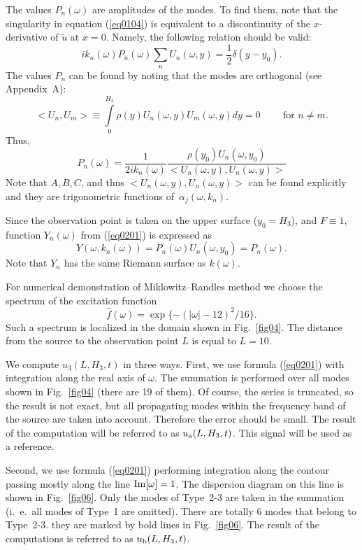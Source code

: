 \documentclass[12pt]{article}
\begin{document}
The values $P_n(\omega)$ are amplitudes of the modes. To find them, note that 
the singularity in equation (\ref{eq0104}) is equivalent to a discontinuity of the $x$-derivative 
of $\tilde u$ at $x =0$. Namely, the following relation should be valid: 
\begin{equation}
i k_n (\omega) P_n(\omega) \sum_n U_n(\omega , y) = \frac{1}{2} \delta(y-y_0) .
\label{eq0404}
\end{equation}  
The values $P_n$ can be found by noting that the modes are orthogonal (see Appendix~A): 
\begin{equation}
<U_n , U_m> \equiv
\int \limits_0^{H_3} \rho(y) U_n (\omega,y) U_m(\omega,y) dy = 
0
\qquad
\mbox{ for }
n \ne m.
\label{eq0405}
\end{equation}
Thus, 
\begin{equation}
P_n(\omega) = \frac{1}{2 i k_n (\omega)} 
\frac{\rho(y_0) U_n (\omega, y_0)}{<U_n (\omega , y) , U_n (\omega , y)>}
\label{eq0406}
\end{equation}
Note that $A, B, C$, and thus $<U_n (\omega , y) , U_n (\omega , y)>$ can be found 
explicitly and they are trigonometric functions of~$\alpha_j(\omega, k_n)$. 

Since the observation point is taken on the upper surface ($y_0 = H_3$), and $F \equiv 1$, function 
$Y_n(\omega)$ from (\ref{eq0201}) is expressed as 
\[
Y(\omega, k_n (\omega)) = P_n(\omega) U_n(\omega , y_0)  = P_n(\omega).
\]
Note that $Y_n$ has the same Riemann surface as $k(\omega)$. 

For numerical demonstration of Miklowitz--Randles method we choose the 
spectrum of the excitation function 
\[
\hat f(\omega) = \exp \{ - (|\omega|-12)^2 / 16 \}. 
\]  
Such a spectrum is localized in the domain shown in Fig.~\ref{fig04}.
The distance from the source to the observation point $L$ is equal to
$L=10$. 

We compute $u_3(L,H_3,t)$ in three ways. First, we use formula (\ref{eq0201})
with integration along the real axis of $\omega$. The summation is performed 
over all modes shown in Fig.~\ref{fig04} (there are 19 of them). Of course, the series is truncated, 
so the result is not exact, but all propagating modes within the frequency band 
of the source
are taken into account. Therefore the error should be small. The result 
of the computation will be referred to as $u_{\rm a} (L , H_3 , t)$.
This signal will be used as a reference.  

Second, we use formula (\ref{eq0201}) performing integration along the contour passing 
mostly along the line ${\rm Im}[\omega] = 1$. The dispersion diagram on this line is shown in 
Fig.~\ref{fig06}. Only the modes of Type~2-3 are taken in the summation (i.~e.\ all modes of Type~1
are omitted). There are totally 6 modes that belong to Type~2-3. they are marked by bold lines 
in Fig.~\ref{fig06}. The result of the computations is referred to as $u_{\rm b} (L , H_3 , t)$.
\end{document}
